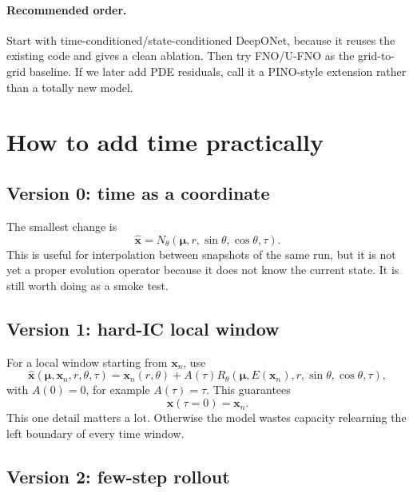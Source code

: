 \documentclass[11pt]{article}
\newcommand{\muvec}{\bm{\mu}}
\newcommand{\xfield}{\bm{x}}
\begin{document}
\paragraph{Recommended order.}
Start with time-conditioned/state-conditioned DeepONet, because it reuses the
existing code and gives a clean ablation. Then try FNO/U-FNO as the grid-to-grid
baseline. If we later add PDE residuals, call it a PINO-style extension rather
than a totally new model.

\section{How to add time practically}

\subsection{Version 0: time as a coordinate}

The smallest change is
\begin{equation}
    \hat{\xfield}
    =
    N_\theta(\muvec,r,\sin\theta,\cos\theta,\tau).
\end{equation}
This is useful for interpolation between snapshots of the same run, but it is
not yet a proper evolution operator because it does not know the current state.
It is still worth doing as a smoke test.

\subsection{Version 1: hard-IC local window}

For a local window starting from \(\xfield_n\), use
\begin{equation}
    \hat{\xfield}(\muvec,\xfield_n,r,\theta,\tau)
    =
    \xfield_n(r,\theta)
    +
    A(\tau)
    R_\theta(\muvec,E(\xfield_n),r,\sin\theta,\cos\theta,\tau),
\end{equation}
with \(A(0)=0\), for example \(A(\tau)=\tau\). This guarantees
\begin{equation}
    \hat{\xfield}(\tau=0)=\xfield_n.
\end{equation}
This one detail matters a lot. Otherwise the model wastes capacity relearning
the left boundary of every time window.

\subsection{Version 2: few-step rollout}
\end{document}
